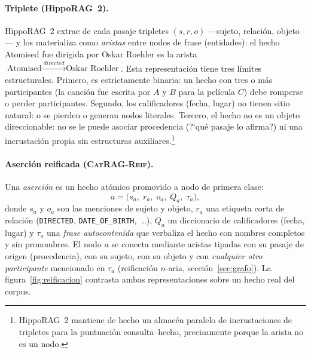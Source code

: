 \documentclass[11pt,a4paper]{article}
\newcommand{\sys}{\textsc{CatRAG-Reif}}          %
\newcommand{\hippo}{HippoRAG~2}
\begin{document}
\paragraph{Triplete (\hippo{}).}
\hippo{} extrae de cada pasaje tripletes $(s,r,o)$ ---sujeto, relación,
objeto--- y los materializa como \emph{aristas} entre nodos de frase
(entidades): el hecho \guillemotleft{}Atomised fue dirigida por Oskar Roehler\guillemotright{} es la arista
$\text{Atomised} \xrightarrow{\;directed\;} \text{Oskar Roehler}$. Esta
representación tiene tres límites estructurales. Primero, es estrictamente
binaria: un hecho con tres o más participantes (\guillemotleft{}la canción fue escrita por
$A$ y $B$ para la película $C$\guillemotright{}) debe romperse o perder participantes.
Segundo, los calificadores (fecha, lugar) no tienen sitio natural: o se
pierden o generan nodos literales. Tercero, el hecho no es un objeto
direccionable: no se le puede asociar procedencia (?`qué pasaje lo afirma?) ni
una incrustación propia sin estructuras auxiliares.\footnote{\hippo{}
mantiene de hecho un almacén paralelo de incrustaciones de tripletes para la
puntuación consulta--hecho, precisamente porque la arista no es un nodo.}

\paragraph{Aserción reificada (\sys{}).}
Una \emph{aserción} es un hecho atómico promovido a nodo de primera clase:
\begin{equation}
a = \bigl(s_a,\; r_a,\; o_a,\; Q_a,\; \tau_a\bigr),
\label{eq:asercion}
\end{equation}
donde $s_a$ y $o_a$ son las menciones de sujeto y objeto, $r_a$ una etiqueta
corta de relación (\texttt{DIRECTED}, \texttt{DATE\_OF\_BIRTH},~\dots),
$Q_a$ un diccionario de calificadores (fecha, lugar) y $\tau_a$ una
\emph{frase autocontenida} que verbaliza el hecho con nombres completos y sin
pronombres. El nodo $a$ se conecta mediante aristas tipadas con su pasaje de
origen (procedencia), con su sujeto, con su objeto y con \emph{cualquier otro
participante} mencionado en $\tau_a$ (reificación $n$-aria,
sección~\ref{sec:grafo}). La figura~\ref{fig:reificacion} contrasta ambas
representaciones sobre un hecho real del corpus.
\end{document}
